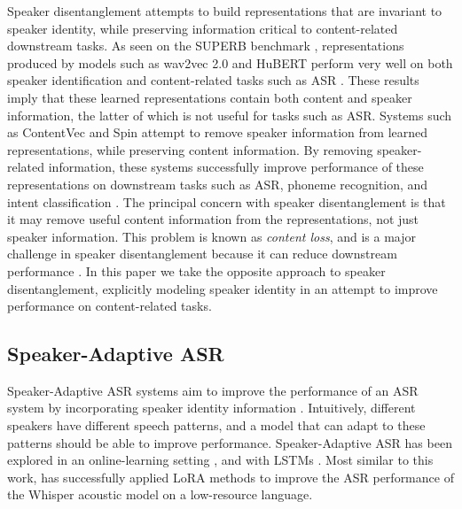 Speaker disentanglement attempts to build representations that are invariant to speaker identity, while preserving information critical to content-related downstream tasks.
As seen on the SUPERB benchmark \cite{superb}, representations produced by models such as wav2vec 2.0 and HuBERT perform very well on both speaker identification and content-related tasks such as ASR \cite{wav2vec2, hubert}.
These results imply that these learned representations contain both content and speaker information, the latter of which is not useful for tasks such as ASR.
Systems such as ContentVec \cite{contentvec} and Spin \cite{spin} attempt to remove speaker information from learned representations, while preserving content information.
By removing speaker-related information, these systems successfully improve performance of these representations on downstream tasks such as ASR, phoneme recognition, and intent classification \cite{contentvec, spin}.
The principal concern with speaker disentanglement is that it may remove useful content information from the representations, not just speaker information.
This problem is known as \textit{content loss}, and is a major challenge in speaker disentanglement because it can reduce downstream performance \cite{contentvec, choi2021neural}.
In this paper we take the opposite approach to speaker disentanglement, explicitly modeling speaker identity in an attempt to improve performance on content-related tasks.

\subsection{Speaker-Adaptive ASR}

Speaker-Adaptive ASR systems aim to improve the performance of an ASR system by incorporating speaker identity information \cite{speakeradaptation, onlinesaasr}.
Intuitively, different speakers have different speech patterns, and a model that can adapt to these patterns should be able to improve performance.
Speaker-Adaptive ASR has been explored in an online-learning setting \cite{onlinesaasr}, and with LSTMs \cite{speakeradaptationlstm}.
Most similar to this work, \cite{childspeech} has successfully applied LoRA methods to improve the ASR performance of the Whisper \cite{whisper} acoustic model on a low-resource language.




